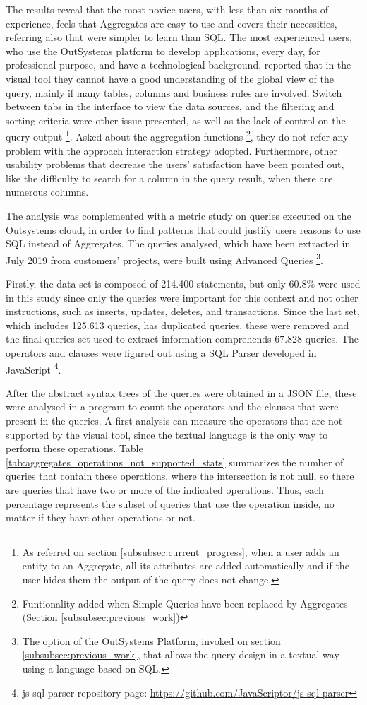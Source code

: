 The results reveal that the most novice users, with less than six months of experience, feels that Aggregates are easy to use and covers their necessities, referring also that were simpler to learn than SQL. The most experienced users, who use the OutSystems platform to develop applications, every day, for professional purpose, and have a technological background, reported that in the visual tool they cannot have a good understanding of the global view of the query, mainly if many tables, columns and business rules are involved. Switch between tabs in the interface to view the data sources, and the filtering and sorting criteria were other issue presented, as well as the lack of control on the query output \footnote{As referred on section \ref{subsubsec:current_progress}, when a user adds an entity to an Aggregate, all its attributes are added automatically and if the user hides them the output of the query does not change.}. Asked about the aggregation functions \footnote{Funtionality added when Simple Queries have been replaced by Aggregates (Section \ref{subsubsec:previous_work})}, they do not refer any problem with the approach interaction strategy adopted. Furthermore, other usability problems that decrease the users’ satisfaction have been pointed out, like the difficulty to search for a column in the query result, when there are numerous columns.

The analysis was complemented with a metric study on queries executed on the Outsystems cloud, in order to find patterns that could justify users reasons to use SQL instead of Aggregates. The queries analysed, which have been extracted in July 2019 from customers’ projects, were built using Advanced Queries \footnote{The option of the OutSystems Platform, invoked on section \ref{subsubsec:previous_work}, that allows the query design in a textual way using a language based on SQL.}.

Firstly, the data set is composed of 214.400 statements, but only 60.8\% were used in this study since only the queries were important for this context and not other instructions, such as inserts, updates, deletes, and transactions. Since the last set, which includes 125.613 queries, has duplicated queries, these were removed and the final queries set used to extract information comprehends 67.828 queries. The operators and clauses were figured out using a SQL Parser developed in JavaScript \footnote{js-sql-parser repository page: \url{https://github.com/JavaScriptor/js-sql-parser}}.

After the abstract syntax trees of the queries were obtained in a JSON file, these were analysed in a program to count the operators and the clauses that were present in the queries. A first analysis can measure the operators that are not supported by the visual tool, since the textual language is the only way to perform these operations. Table \ref{tab:aggregates_operations_not_supported_stats} summarizes the number of queries that contain these operations, where the intersection is not null, so there are queries that have two or more of the indicated operations. Thus, each percentage represents the subset of queries that use the operation inside, no matter if they have other operations or not.

